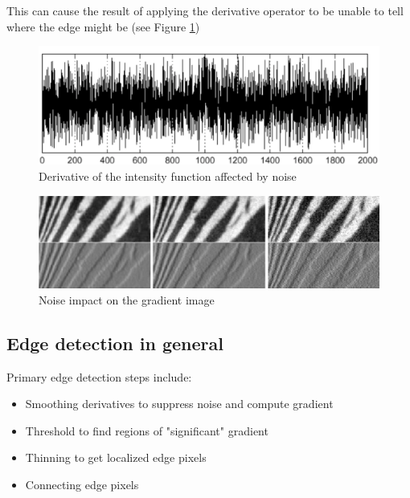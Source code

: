 This can cause the result of applying the derivative operator to be unable to tell where the edge might be (see Figure \ref{fig:noise_derivative})
\begin{figure}[H]
	\centering
	\includegraphics[width=\textwidth]{images/noise_derivative}
	\caption{Derivative of the intensity function affected by noise}
	\label{fig:noise_derivative}
\end{figure}
\begin{figure}[H]
	\centering
	\includegraphics[width=\textwidth]{images/noise_impact}
	\caption{Noise impact on the gradient image}
	\label{fig:noise_impact}
\end{figure}

\subsection{Edge detection in general}
Primary edge detection steps include:
\begin{itemize}
	\item Smoothing derivatives to suppress noise and compute gradient
	\item Threshold to find regions of "significant" gradient
	\item Thinning to get localized edge pixels
	\item Connecting edge pixels
\end{itemize}

